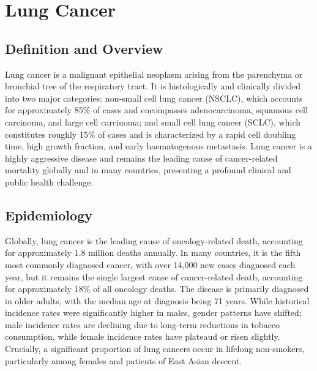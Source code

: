 \chapter{Lung Cancer}

\section*{Definition and Overview}
Lung cancer is a malignant epithelial neoplasm arising from the parenchyma or bronchial tree of the respiratory tract. It is histologically and clinically divided into two major categories: non-small cell lung cancer (NSCLC), which accounts for approximately 85\% of cases and encompasses adenocarcinoma, squamous cell carcinoma, and large cell carcinoma; and small cell lung cancer (SCLC), which constitutes roughly 15\% of cases and is characterized by a rapid cell doubling time, high growth fraction, and early haematogenous metastasis. Lung cancer is a highly aggressive disease and remains the leading cause of cancer-related mortality globally and in many countries, presenting a profound clinical and public health challenge.

\section*{Epidemiology}
Globally, lung cancer is the leading cause of oncology-related death, accounting for approximately 1.8 million deaths annually. In many countries, it is the fifth most commonly diagnosed cancer, with over 14,000 new cases diagnosed each year, but it remains the single largest cause of cancer-related death, accounting for approximately 18\% of all oncology deaths. The disease is primarily diagnosed in older adults, with the median age at diagnosis being 71 years. While historical incidence rates were significantly higher in males, gender patterns have shifted; male incidence rates are declining due to long-term reductions in tobacco consumption, while female incidence rates have plateaud or risen slightly. Crucially, a significant proportion of lung cancers occur in lifelong non-smokers, particularly among females and patients of East Asian descent.

